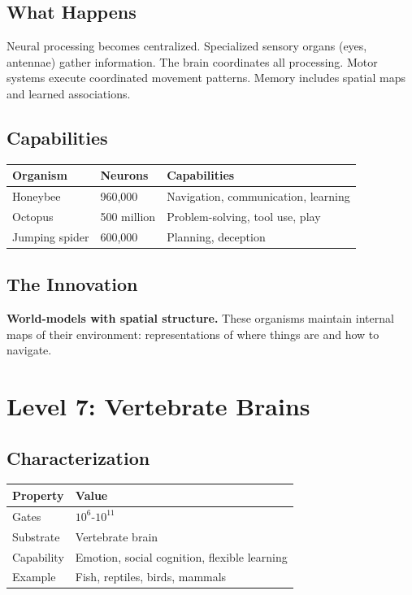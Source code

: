 \documentclass[
  11pt,
  letterpaper,
  twoside,
  openright]{book}
\begin{document}
\subsection{What Happens}\label{what-happens-6}

Neural processing becomes centralized. Specialized sensory organs (eyes,
antennae) gather information. The brain coordinates all processing.
Motor systems execute coordinated movement patterns. Memory includes
spatial maps and learned associations.

\subsection{Capabilities}\label{capabilities}

\begin{longtable}[]{@{}lll@{}}
\toprule\noalign{}
Organism & Neurons & Capabilities \\
\midrule\noalign{}
\endhead
\bottomrule\noalign{}
\endlastfoot
Honeybee & 960,000 & Navigation, communication, learning \\
Octopus & 500 million & Problem-solving, tool use, play \\
Jumping spider & 600,000 & Planning, deception \\
\end{longtable}

\subsection{The Innovation}\label{the-innovation-4}

\textbf{World-models with spatial structure.} These organisms maintain
internal maps of their environment: representations of where things are
and how to navigate.

\section{Level 7: Vertebrate Brains}\label{level-7-vertebrate-brains}

\subsection{Characterization}\label{characterization-7}

\begin{longtable}[]{@{}ll@{}}
\toprule\noalign{}
Property & Value \\
\midrule\noalign{}
\endhead
\bottomrule\noalign{}
\endlastfoot
Gates & \(10^6\)-\(10^{11}\) \\
Substrate & Vertebrate brain \\
Capability & Emotion, social cognition, flexible learning \\
Example & Fish, reptiles, birds, mammals \\
\end{longtable}
\end{document}
